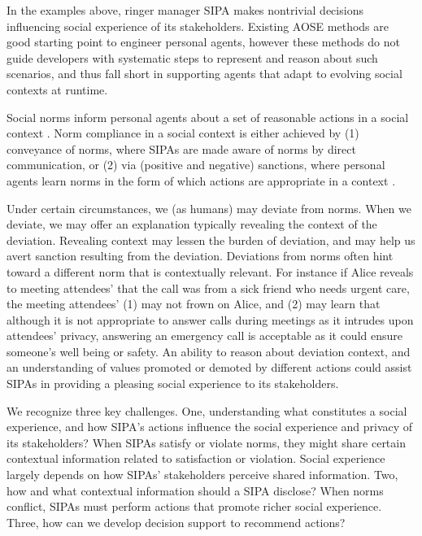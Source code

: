 \documentclass[11pt,          %
               phd,           %
               onehalfspacing %
               ]{ncsuthesis}
\begin{document}
In the examples above, ringer manager SIPA makes nontrivial decisions
influencing social experience of its stakeholders. Existing AOSE methods
\citep{Bresciani-JAAMAS04-Tropos,Winikoff-2004-DIA,Murukannaiah-AAMAS14-Xipho}
are good starting point to engineer personal agents, however these
methods do not guide developers with systematic steps to represent and
reason about such scenarios, and thus fall short in supporting agents
that adapt to evolving social contexts at runtime.

Social norms inform personal agents about a set of reasonable actions in a social
context \citep{vanRiemsdijk-AAMAS15-SociallyAdaptive}. Norm compliance in
a social context is either achieved by (1) conveyance of norms, where
SIPAs are made aware of norms by direct communication, or (2) via
(positive and negative) sanctions, where personal agents learn norms in the form
of which actions are appropriate in a context
\citep{Andrighetto-2013-PunishVoice}. 

Under certain circumstances, we (as humans) may deviate from norms. When
we deviate, we may offer an explanation typically revealing the context
of the deviation. Revealing context may lessen the burden of deviation,
and may help us avert sanction resulting from the deviation. Deviations
from norms often hint toward a different norm that is contextually
relevant. For instance if Alice reveals to meeting attendees' that the
call was from a sick friend who needs urgent care, the meeting
attendees' (1) may not frown on Alice, and (2) may learn that although
it is not appropriate to answer calls during meetings as it intrudes
upon attendees' privacy, answering an emergency call is acceptable as it
could ensure someone's well being or safety. An ability to reason about
deviation context, and an understanding of values promoted or demoted by different
actions could assist SIPAs in providing a pleasing social experience to
its stakeholders.

We recognize three key challenges. One, understanding what constitutes a
social experience, and how SIPA's actions influence the social
experience and privacy of its stakeholders? When SIPAs satisfy or violate
norms, they might share certain contextual information related to
satisfaction or violation. Social experience largely depends on how
SIPAs' stakeholders perceive shared information. Two, how and what
contextual information should a SIPA disclose? When norms conflict,
SIPAs must perform actions that promote richer social experience. Three,
how can we develop decision support to recommend actions?
\end{document}
